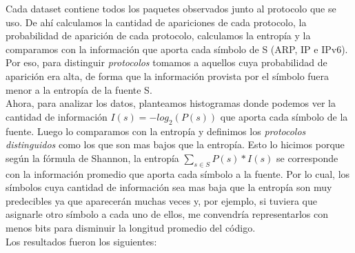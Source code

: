 Cada dataset contiene todos los paquetes observados junto al protocolo que se uso. De ahí calculamos la cantidad de apariciones de cada protocolo, la probabilidad de aparición de cada protocolo, calculamos la entropía y la comparamos con la información que aporta cada símbolo de S (ARP, IP e IPv6).\\

Por eso, para distinguir \emph{protocolos} tomamos a
aquellos cuya probabilidad de aparición era alta, de forma que la información provista por el símbolo fuera menor a la entropía de la fuente S.\\

Ahora, para analizar los datos, planteamos histogramas donde podemos ver la cantidad de información $I(s) = -log_2(P(s))$ que aporta cada símbolo de la fuente. Luego lo comparamos con la entropía y definimos los \emph{protocolos distinguidos} como los que son mas bajos que la entropía. Esto lo hicimos porque según la fórmula de Shannon, la entropía $\sum\limits_{s \in S} P(s) * I(s)$ se corresponde con la información promedio que aporta cada símbolo a la fuente. Por lo cual, los símbolos cuya cantidad de información sea mas baja que la entropía son muy predecibles ya que aparecerán muchas veces y, por ejemplo, si tuviera que asignarle otro símbolo a cada uno de ellos, me convendría representarlos con menos bits para disminuir la longitud promedio del código. \\

Los resultados fueron los siguientes: \\


